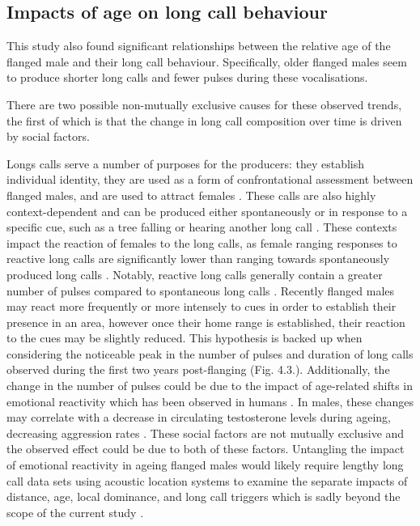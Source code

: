 \subsection{Impacts of age on long call behaviour}

This study also found significant relationships between the relative age of the flanged male and their long call behaviour. Specifically, older flanged males seem to produce shorter long calls and fewer pulses during these vocalisations. 

There are two possible non-mutually exclusive causes for these observed trends, the first of which is that the change in long call composition over time is driven by social factors. 

Longs calls serve a number of purposes for the producers: they establish individual identity, they are used as a form of confrontational assessment between flanged males, and are used to attract females \citep{Mitani.1985, Spillmann.2016, Setia.2007}. These calls are also highly context-dependent and can be produced either spontaneously or in response to a specific cue, such as a tree falling or hearing another long call \citep{Spillmann.2010}. These contexts impact the reaction of females to the long calls, as female ranging responses to reactive long calls are significantly lower than ranging towards spontaneously produced long calls \citep{Spillmann.2016}. Notably, reactive long calls generally contain a greater number of pulses compared to spontaneous long calls \citep{Spillmann.2016}. Recently flanged males may react more frequently or more intensely to cues in order to establish their presence in an area, however once their home range is established, their reaction to the cues may be slightly reduced. This hypothesis is backed up when considering the noticeable peak in the number of pulses and duration of long calls observed during the first two years post-flanging (Fig. 4.3.). Additionally, the change in the number of pulses could be due to the impact of age-related shifts in emotional reactivity which has been observed in humans \citep{Grühn.2016}. In males, these changes may correlate with a decrease in circulating testosterone levels during ageing, decreasing aggression rates \citep{Book.2001}. These social factors are not mutually exclusive and the observed effect could be due to both of these factors. Untangling the impact of emotional reactivity in ageing flanged males would likely require lengthy long call data sets using acoustic location systems to examine the separate impacts of distance, age, local dominance, and long call triggers which is sadly beyond the scope of the current study \citep{Spillmann.2016}. 

